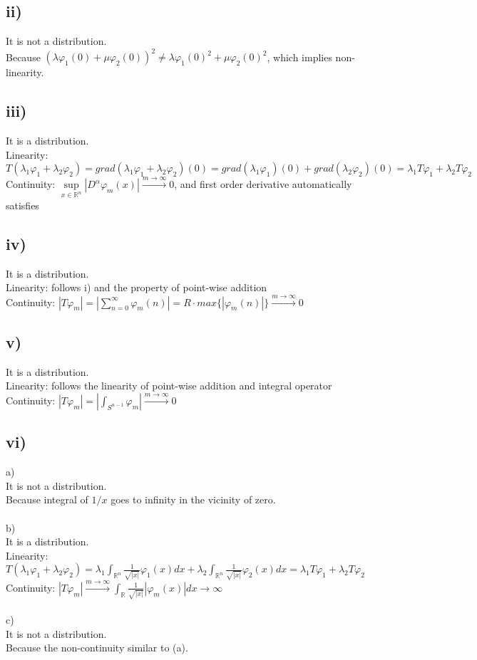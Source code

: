 \documentclass{article}
\begin{document}
\subsection*{ii)}
It is not a distribution. \\
Because $(\lambda \varphi_1(0) + \mu \varphi_2(0))^2 \neq \lambda \varphi_1(0)^2 + \mu \varphi_2(0)^2$, which implies non-linearity.
\subsection*{iii)}
It is a distribution. \\
Linearity: $T(\lambda_1 \varphi_1 + \lambda_2 \varphi_2)=grad(\lambda_1 \varphi_1 + \lambda_2 \varphi_2)(0)=grad(\lambda_1 \varphi_1)(0) + grad(\lambda_2 \varphi_2)(0)=\lambda_1 T\varphi_1 + \lambda_2 T\varphi_2$ \\
Continuity: $\sup\limits_{x \in  \mathbb{R}^n} \left|D^\alpha \varphi_m (x)\right| \xrightarrow{m \to \infty}0 $, and first order derivative automatically satisfies
\subsection*{iv)}
It is a distribution. \\
Linearity: follows i) and the property of point-wise addition\\
Continuity: $\left|T\varphi_m\right| =\left|\sum_{n=0}^\infty \varphi_m(n)\right|=R\cdot max\{\left|\varphi_m(n)\right|\} \xrightarrow{m \to \infty}0$
\subsection*{v)}
It is a distribution.\\
Linearity: follows the linearity of point-wise addition and integral operator \\
Continuity: $\left|T\varphi_m\right| = \left|\int_{S^{n-1}} \varphi_m \right| \xrightarrow{m \to \infty}0 $
\subsection*{vi)}
a) \\
It is not a distribution.\\
Because integral of $1/x$ goes to infinity in the vicinity of zero.\\
\\
b) \\
It is a distribution. \\
Linearity: $T(\lambda_1 \varphi_1 + \lambda_2 \varphi_2)= \lambda_1 \int_{\mathbb{R}^n}\frac{1}{\sqrt{|x|}}\varphi_1(x)dx + \lambda_2 \int_{\mathbb{R}^n}\frac{1}{\sqrt{|x|}}\varphi_2(x)dx=\lambda_1 T\varphi_1 + \lambda_2 T\varphi_2$ \\
Continuity: $\left|T\varphi_m\right| \xrightarrow{m \to \infty} \int_{\mathbb{R}}\frac{1}{\sqrt{|x|}} \left|\varphi_m(x)\right|dx \to \infty$\\
\\
c) \\
It is not a distribution. \\
Because the non-continuity similar to (a).
\end{document}
